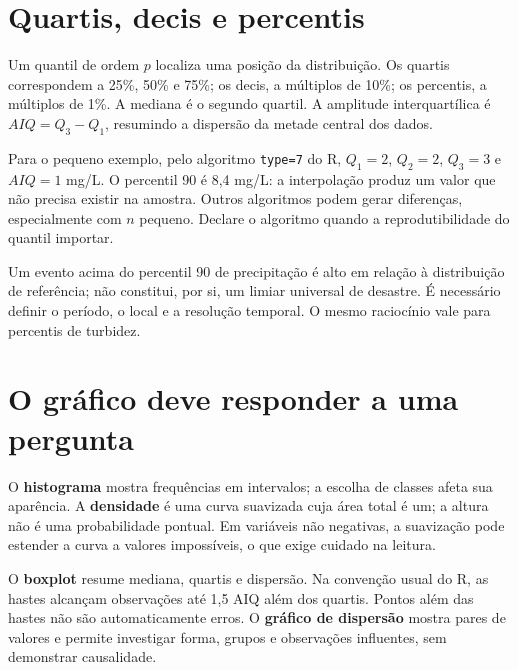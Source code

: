 \section{Quartis, decis e percentis}
Um quantil de ordem $p$ localiza uma posição da distribuição. Os quartis correspondem a 25\%, 50\% e 75\%; os decis, a múltiplos de 10\%; os percentis, a múltiplos de 1\%. A mediana é o segundo quartil. A amplitude interquartílica é $AIQ=Q_3-Q_1$, resumindo a dispersão da metade central dos dados.

Para o pequeno exemplo, pelo algoritmo \texttt{type=7} do R, $Q_1=2$, $Q_2=2$, $Q_3=3$ e $AIQ=1$ mg/L. O percentil 90 é 8,4 mg/L: a interpolação produz um valor que não precisa existir na amostra. Outros algoritmos podem gerar diferenças, especialmente com $n$ pequeno. Declare o algoritmo quando a reprodutibilidade do quantil importar.

Um evento acima do percentil 90 de precipitação é alto em relação à distribuição de referência; não constitui, por si, um limiar universal de desastre. É necessário definir o período, o local e a resolução temporal. O mesmo raciocínio vale para percentis de turbidez.

\section{O gráfico deve responder a uma pergunta}
O \textbf{histograma} mostra frequências em intervalos; a escolha de classes afeta sua aparência. A \textbf{densidade} é uma curva suavizada cuja área total é um; a altura não é uma probabilidade pontual. Em variáveis não negativas, a suavização pode estender a curva a valores impossíveis, o que exige cuidado na leitura.

O \textbf{boxplot} resume mediana, quartis e dispersão. Na convenção usual do R, as hastes alcançam observações até 1,5 AIQ além dos quartis. Pontos além das hastes não são automaticamente erros. O \textbf{gráfico de dispersão} mostra pares de valores e permite investigar forma, grupos e observações influentes, sem demonstrar causalidade.


